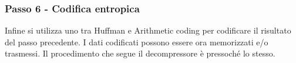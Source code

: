\begin{figure}[htbp!]
  \centering
  
\end{figure}
\FloatBarrier

\subsubsection{Passo 6 - Codifica entropica}
Infine si utilizza uno tra Huffman e Arithmetic coding per codificare il risultato del passo precedente. I dati codificati possono essere ora memorizzati e/o trasmessi.
Il procedimento che segue il decompressore è pressoché lo stesso.


\let\cleardoublepage\clearpage